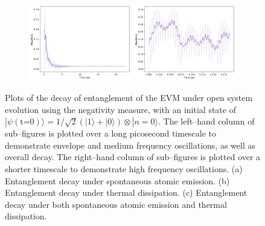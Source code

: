 \documentclass[11pt]{article}
\begin{document}
\begin{figure}[H]
    \vspace{0.8em}

    \begin{subfigure}{\textwidth}
        \centering
        \includegraphics[width=0.49\textwidth]{Research Project/Code/results/ExVib/Open/Negativity/Envelope/neg_both_eg.png}
        \hfill
        \includegraphics[width=0.49\textwidth]{Research Project/Code/results/ExVib/Open/Negativity/Fast/neg_both_eg.png}
        \caption{}
        \label{fig:EVM_OQS_Neg_both_eg}
    \end{subfigure}
    \caption{Plots of the decay of entanglement of the EVM under open system evolution using the negativity measure, with an initial state of $|\psi (\text{t=0})\rangle = 1/\sqrt{2}(|1\rangle + |0\rangle)\otimes|n=0\rangle$. The left--hand column of sub--figures is plotted over a long picosecond timescale to demonstrate envelope and medium frequency oscillations, as well as overall decay. The right--hand column of sub--figures is plotted over a shorter timescale to demonstrate high frequency oscillations. (a) Entanglement decay under spontaneous atomic emission. (b) Entanglement decay under thermal dissipation. (c) Entanglement decay under both spontaneous atomic emission and thermal dissipation.}
    \label{fig:EVM_OQS_Neg_eg}
\end{figure}
\end{document}
